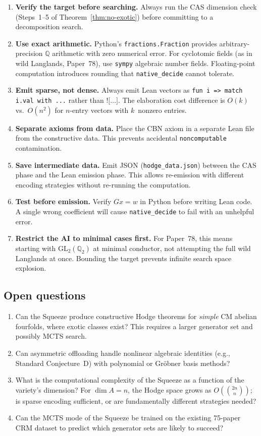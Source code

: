 \documentclass[11pt]{article}
\theoremstyle{plain}
\theoremstyle{definition}
\theoremstyle{remark}
\newcommand{\Q}{\mathbb{Q}}
\newcommand{\GL}{\mathrm{GL}}
\begin{document}
\begin{enumerate}[nosep]
\item \textbf{Verify the target before searching.}  Always run the
  CAS dimension check (Steps~1--5 of Theorem~\ref{thm:no-exotic})
  before committing to a decomposition search.
\item \textbf{Use exact arithmetic.}  Python's
  \texttt{fractions.Fraction} provides arbitrary-precision $\Q$
  arithmetic with zero numerical error.  For cyclotomic fields
  (as in wild Langlands, Paper~78), use \texttt{sympy} algebraic
  number fields.  Floating-point computation introduces rounding
  that \texttt{native\_decide} cannot tolerate.
\item \textbf{Emit sparse, not dense.}  Always emit Lean vectors
  as \texttt{fun i => match i.val with ...} rather than
  $\texttt{![}\ldots\texttt{]}$.  The elaboration cost difference
  is $O(k)$ vs.\ $O(n^2)$ for $n$-entry vectors with $k$~nonzero entries.
\item \textbf{Separate axioms from data.}  Place the CBN axiom in
  a separate Lean file from the constructive data.  This prevents
  accidental \texttt{noncomputable} contamination.
\item \textbf{Save intermediate data.}  Emit JSON
  (\texttt{hodge\_data.json}) between the CAS phase and the
  Lean emission phase.  This allows re-emission with different
  encoding strategies without re-running the computation.
\item \textbf{Test before emission.}  Verify $Gx = w$ in Python
  before writing Lean code.  A single wrong coefficient will cause
  \texttt{native\_decide} to fail with an unhelpful error.
\item \textbf{Restrict the AI to minimal cases first.}  For
  Paper~78, this means starting with $\GL_2(\Q_2)$ at minimal
  conductor, not attempting the full wild Langlands at once.
  Bounding the target prevents infinite search space explosion.
\end{enumerate}

\subsection{Open questions}

\begin{enumerate}[nosep]
\item Can the Squeeze produce constructive Hodge theorems for
  \emph{simple} CM abelian fourfolds, where exotic classes exist?
  This requires a larger generator set and possibly MCTS search.
\item Can asymmetric offloading handle nonlinear algebraic
  identities (e.g., Standard Conjecture~D) with polynomial
  or Gr\"obner basis methods?
\item What is the computational complexity of the Squeeze as a
  function of the variety's dimension?  For $\dim A = n$,
  the Hodge space grows as $O(\binom{2n}{n})$; is sparse encoding
  sufficient, or are fundamentally different strategies needed?
\item Can the MCTS mode of the Squeeze be trained on the existing
  75-paper CRM dataset to predict which generator sets are likely
  to succeed?
\end{enumerate}
\end{document}
